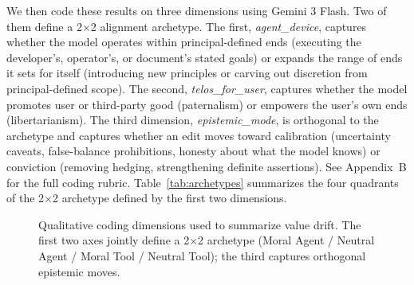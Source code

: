 \documentclass[12pt]{article}
\begin{document}
We then code these results on three dimensions using Gemini 3 Flash. Two of them define a 2$\times$2 alignment archetype. The first, \emph{agent\_device}, captures whether the model operates within principal-defined ends (executing the developer's, operator's, or document's stated goals) or expands the range of ends it sets for itself (introducing new principles or carving out discretion from principal-defined scope). The second, \emph{telos\_for\_user}, captures whether the model promotes user or third-party good (paternalism) or empowers the user's own ends (libertarianism). The third dimension, \emph{epistemic\_mode}, is orthogonal to the archetype and captures whether an edit moves toward calibration (uncertainty caveats, false-balance prohibitions, honesty about what the model knows) or conviction (removing hedging, strengthening definite assertions). See Appendix~B for the full coding rubric. Table~\ref{tab:archetypes} summarizes the four quadrants of the 2$\times$2 archetype defined by the first two dimensions.

\begin{figure}[htbp]
  \centering
  \caption{Qualitative coding dimensions used to summarize value drift. The first two axes jointly define a 2$\times$2 archetype (Moral Agent / Neutral Agent / Moral Tool / Neutral Tool); the third captures orthogonal epistemic moves.}
  \label{fig:coding-schema}
\end{figure}
\end{document}
